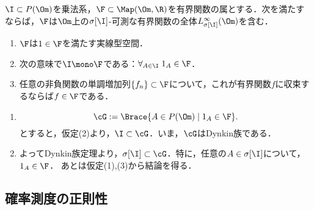 \documentclass[uplatex,dvipdfmx]{jsreport}
\begin{document}
\begin{theorem}[関数に関する単調族定理]
    $\I\subset P(\Om)$を乗法系，$\F\subset\Map(\Om,\R)$を有界関数の属とする．次を満たすならば，$\F$は$\Om$上の$\sigma[\I]$-可測な有界関数の全体$L^\infty_{\sigma[\I]}(\Om)$を含む．
    \begin{enumerate}
        \item $\F$は$1\in\F$を満たす実線型空間．
        \item 次の意味で$\I\mono\F$である：$\forall_{A\in\I}\;1_A\in\F$．
        \item 任意の非負関数の単調増加列$\{f_n\}\subset\F$について，これが有界関数$f$に収束するならば$f\in\F$である．
    \end{enumerate}
\end{theorem}
\begin{Proof}\mbox{}
    \begin{enumerate}[{Step}1]
        \item \[\cG:=\Brace{A\in P(\Om)\mid 1_A\in\F}.\]
        とすると，仮定(2)より，$\I\subset\cG$．いま，$\cG$はDynkin族である．
        \item よってDynkin族定理より，$\sigma[\I]\subset\cG$．特に，任意の$A\in\sigma[\I]$について，$1_A\in\F$．
        あとは仮定(1),(3)から結論を得る．
    \end{enumerate}
\end{Proof}

\subsection{確率測度の正則性}
\end{document}
